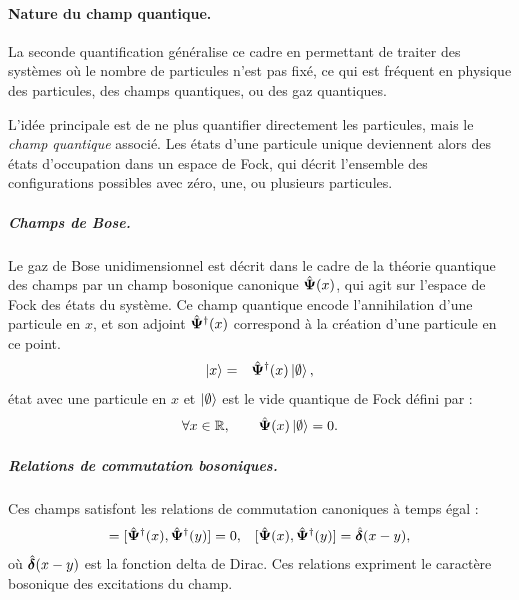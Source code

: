 \paragraph{Nature du champ quantique.}
La seconde quantification généralise ce cadre en permettant de traiter des systèmes où le nombre de particules n’est pas fixé, ce qui est fréquent en physique des particules, des champs quantiques, ou des gaz quantiques.

L’idée principale est de ne plus quantifier directement les particules, mais le \emph{champ quantique} associé. Les états d’une particule unique deviennent alors des états d’occupation dans un espace de Fock, qui décrit l’ensemble des configurations possibles avec zéro, une, ou plusieurs particules.



\subparagraph{Champs de Bose.}
Le gaz de Bose unidimensionnel est décrit dans le cadre de la théorie quantique des champs par un champ bosonique canonique \( \hat{\bm{\Psi}}(x) \), qui agit sur l’espace de Fock des états du système. Ce champ quantique encode l’annihilation d’une particule en \( x \), et son adjoint \( \hat{\bm{\Psi}}^\dag(x) \) correspond à la création d’une particule en ce point. 
\begin{eqnarray}
	\vert x \rangle  & = & \hat{\bm{\Psi}}^\dag (x)\ket{\emptyset} ,
\end{eqnarray}
état avec une particule en  $x$ et \(\ket{\emptyset}\) est le vide quantique de Fock défini par :
\begin{eqnarray}
	\forall x \in \mathbb{R}, \qquad \hat{\bm{\Psi}}(x) \ket{\emptyset} = 0. \label{chap:eq.vide.fock}
\end{eqnarray}

\subparagraph{Relations de commutation bosoniques.}
Ces champs satisfont les relations de commutation canoniques à temps égal :
\begin{eqnarray}
	 [ \operator{\Psi}(x),  \operator{\Psi}(y)  ]   =  [ \operator{\Psi}^\dag(x),  \operator{\Psi}^\dag(y) ]  =  0,   & & [ \operator{\Psi}(x),  \operator{\Psi}^\dagger(y) ]  =  \operator{\delta}(x - y) ,\label{chap:1:com.1}
\end{eqnarray}
où $\hat{\bm{\delta}}(x - y)$ est la fonction delta de Dirac.  
Ces relations expriment le caractère bosonique des excitations du champ.


